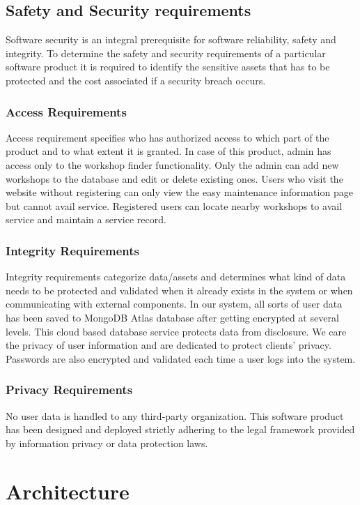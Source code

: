 \documentclass[11pt]{article} %
\begin{document}
	\subsection{Safety and Security requirements}
	Software security is an integral prerequisite for software reliability, safety and integrity. To determine the safety and security requirements of a particular software product it is required to identify the sensitive assets that has to be protected and the cost associated if a security breach occurs.
	
		\subsubsection{Access Requirements}
		Access requirement specifies who has authorized access to which part of the product and to what extent it is granted. In case of this product, admin has access only to the workshop finder functionality. Only the admin can add new workshops to the database and edit or delete existing ones. Users who visit the website without registering can only view the easy maintenance information page but cannot avail service. Registered users can locate nearby workshops to avail service and maintain a service record.
		\subsubsection{Integrity Requirements} 
		Integrity requirements categorize data/assets and determines what kind of data needs to be protected and validated when it already exists in the system or when communicating with external components. In our system, all sorts of user data has been saved to MongoDB Atlas database after getting encrypted at several levels. This cloud based database service protects data from disclosure. We care the privacy of user information and are dedicated to protect clients' privacy. Passwords are also encrypted and validated each time a user logs into the system. 
		\subsubsection{Privacy Requirements}
		No user data is handled to any third-party organization. This software product has been designed and deployed strictly adhering to the legal framework provided by information privacy or data protection laws.
	
\section{Architecture}
\end{document}
